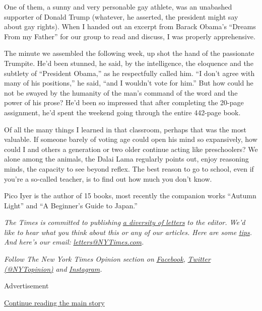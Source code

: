 One of them, a sunny and very personable gay athlete, was an unabashed
supporter of Donald Trump (whatever, he asserted, the president might
say about gay rights). When I handed out an excerpt from Barack Obama's
``Dreams From my Father'' for our group to read and discuss, I was
properly apprehensive.

The minute we assembled the following week, up shot the hand of the
passionate Trumpite. He'd been stunned, he said, by the intelligence,
the eloquence and the subtlety of ``President Obama,'' as he
respectfully called him. ``I don't agree with many of his positions,''
he said, ``and I wouldn't vote for him.'' But how could he not be swayed
by the humanity of the man's command of the word and the power of his
prose? He'd been so impressed that after completing the 20-page
assignment, he'd spent the weekend going through the entire 442-page
book.

Of all the many things I learned in that classroom, perhaps that was the
most valuable. If someone barely of voting age could open his mind so
expansively, how could I and others a generation or two older continue
acting like preschoolers? We alone among the animals, the Dalai Lama
regularly points out, enjoy reasoning minds, the capacity to see beyond
reflex. The best reason to go to school, even if you're a so-called
teacher, is to find out how much you don't know.

Pico Iyer is the author of 15 books, most recently the companion works
``Autumn Light'' and ``A Beginner's Guide to Japan.''

\emph{The Times is committed to publishing}
\href{https://www.nytimes3xbfgragh.onion/2019/01/31/opinion/letters/letters-to-editor-new-york-times-women.html}{\emph{a
diversity of letters}} \emph{to the editor. We'd like to hear what you
think about this or any of our articles. Here are some}
\href{https://help.nytimes3xbfgragh.onion/hc/en-us/articles/115014925288-How-to-submit-a-letter-to-the-editor}{\emph{tips}}\emph{.
And here's our email:}
\href{mailto:letters@NYTimes.com}{\emph{letters@NYTimes.com}}\emph{.}

\emph{Follow The New York Times Opinion section on}
\href{https://www.facebookcorewwwi.onion/nytopinion}{\emph{Facebook}}\emph{,}
\href{http://twitter.com/NYTOpinion}{\emph{Twitter (@NYTopinion)}}
\emph{and}
\href{https://www.instagram.com/nytopinion/}{\emph{Instagram}}\emph{.}

Advertisement

\protect\hyperlink{after-bottom}{Continue reading the main story}

